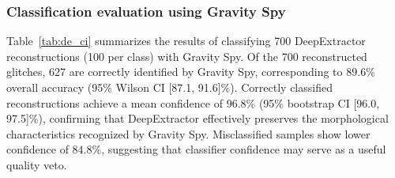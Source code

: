 \documentclass[reprint,nofootinbib,amsmath,amssymb,aps,floatfix]{revtex4-2}
\begin{document}



\subsubsection{Classification evaluation using Gravity Spy}

Table~\ref{tab:de_ci} summarizes the results of classifying 700 DeepExtractor reconstructions (100 per class) with Gravity Spy.
Of the 700 reconstructed glitches, 627 are correctly identified by Gravity Spy, corresponding to $89.6\%$ overall accuracy (95\% Wilson CI [87.1, 91.6]\%).
Correctly classified reconstructions achieve a mean confidence of $96.8\%$ (95\% bootstrap CI [96.0, 97.5]\%), confirming that DeepExtractor effectively preserves the morphological characteristics recognized by Gravity Spy.
Misclassified samples show lower confidence of $84.8\%$, suggesting that classifier confidence may serve as a useful quality veto.
\end{document}
